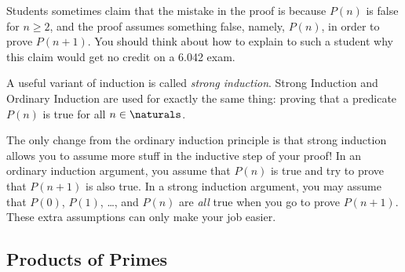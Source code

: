
Students sometimes claim that the mistake in the proof is because $P(n)$
is false for $n \geq 2$, and the proof assumes something false, namely,
$P(n)$, in order to prove $P(n+1)$.  You should think about how to explain
to such a student why this claim would get no credit on a 6.042 exam.

{}




A useful variant of induction is called {\em strong induction}.  Strong
Induction and Ordinary Induction are used for exactly the same thing:
proving that a predicate $P(n)$ is true for all $n \in \naturals$.


The only change from the ordinary induction principle is that strong
induction allows you to assume more stuff in the inductive step of your
proof!  In an ordinary induction argument, you assume that $P(n)$ is true
and try to prove that $P(n+1)$ is also true.  In a strong induction
argument, you may assume that $P(0)$, $P(1)$, \dots, and $P(n)$ are
\textit{all} true when you go to prove $P(n+1)$.  These extra assumptions
can only make your job easier.

\subsection{Products of Primes}

